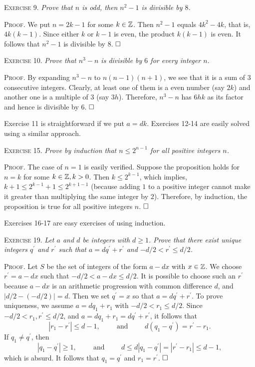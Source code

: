 \documentclass[11pt, leqno]{article}
\newcommand{\done}{\ensuremath{\hfill\square}}
\begin{document}
\textsc{Exercise 9}. \emph{Prove that $n$ is odd, then $n^2-1$ is divisible by $8$.}

\textsc{Proof}. We put $n=2k-1$ for some $k\in\mathbb{Z}$. Then $n^2-1$ equals $4k^2-4k$, that is, $4k(k-1)$. Since either $k$ or $k-1$ is even, the product $k(k-1)$ is even. It follows that $n^2-1$ is divisible by $8$. \done

\textsc{Exercise 10}. \emph{Prove that $n^3-n$ is divisible by $6$ for every integer $n$.}

\textsc{Proof}. By expanding $n^3-n$ to $n(n-1)(n+1)$, we see that it is a sum of $3$ consecutive integers. Clearly, at least one of them is a even number (say $2k$) and another one is a multiple of $3$ (say $3h$). Therefore, $n^3-n$ has $6hk$ as its factor and hence is divisible by $6$. \done

Exercise 11 is straightforward if we put $a=dk$. Exercises 12-14 are easily solved using a similar approach. 

\textsc{Exercise 15}. \emph{Prove by induction that $n\leq 2^{n-1}$ for all positive integers $n$.}

\textsc{Proof}. The case of $n=1$ is easily verified. Suppose the proposition holds for $n=k$ for some $k\in\mathbb{Z}, k>0$. Then $k \leq 2^{k-1}$, which implies, $k+1 \leq 2^{k-1}+1 \leq 2^{k+1-1}$ (because adding $1$ to a positive integer cannot make it greater than multiplying the same integer by $2$). Therefore, by induction, the proposition is true for all positive integers $n$. \done

Exercises 16-17 are easy exercises of using induction.

\textsc{Exercise 19}. \emph{Let $a$ and $d$ be integers with $d\geq 1$. Prove that there exist unique integers $q^{\prime}$ and $r^{\prime}$ such that $a=dq^{\prime} + r^{\prime}$ and $-d/2 < r^{\prime} \leq d/2$.}

\textsc{Proof}. Let $S$ be the set of integers of the form $a-dx$ with $x\in\mathbb{Z}$. We choose $r^{\prime} = a-dx$ such that $-d/2 < a-dx \leq d/2$. It is possible to choose such an $r^{\prime}$ because $a-dx$ is an arithmetic progression with common difference $d$, and $|d/2 - (-d/2)| = d$. Then we set $q^{\prime} = x$ so that $a = dq^{\prime} + r^{\prime}$. To prove uniqueness, we assume $a = dq_1 + r_1$ with $-d/2 < r_1 \leq d/2$. Since $-d/2 < r_1, r^{\prime} \leq d/2$, and $a = dq_1+r_1 = dq^{\prime} + r^{\prime}$, it follows that 
\begin{displaymath}
|r_1 - r^{\prime}| \leq d-1, \hspace{1cm} \text{and} \hspace{1cm} d(q_1-q^{\prime}) = r^{\prime} - r_1.
\end{displaymath}
If $q_1 \ne q^{\prime}$, then 
\begin{displaymath}
|q_1 - q^{\prime}| \geq 1, \hspace{1cm} \text{and} \hspace{1cm} d\leq d|q_1-q^{\prime}| = |r^{\prime} - r_1 | \leq d-1,
\end{displaymath}
which is absurd. It follows that $q_1 = q^{\prime}$ and $r_1 = r^{\prime}$. \done
\end{document}

